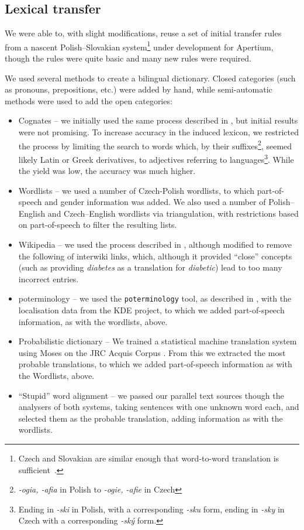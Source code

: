 \documentclass[11pt]{article}
\begin{document}
\subsection{Lexical transfer}

We were able to, with slight modifications, reuse a set of initial
transfer rules from a nascent Polish--Slovakian system\footnote{Czech 
and Slovakian are similar enough that word-to-word translation is sufficient~\citep{}.} under
development for Apertium, though the rules were quite basic
and many new rules were required.

We used several methods to create a bilingual dictionary. Closed 
categories (such as pronouns, prepositions, etc.) were added by
hand, while semi-automatic methods were used to add the open 
categories:

\begin{itemize}
\item Cognates -- we initially used the same process described in \cite{tyers2009rfr}, 
but initial results were not promising. To increase accuracy in the induced lexicon,
we restricted the process by limiting the search to words which, by their 
suffixes\footnote{\emph{-ogia, -afia} in Polish to \emph{-ogie, -afie} in Czech}, 
seemed likely Latin or Greek derivatives, to adjectives referring to 
languages\footnote{Ending in \emph{-ski} in Polish, with a corresponding \emph{-sku} form,
ending in \emph{-sky} in Czech with a corresponding \emph{-ský} form.}. While the
yield was low, the accuracy was much higher.

\item Wordlists -- we used a number of Czech-Polish wordlists, to which part-of-speech 
and gender information was added. We also used a number of Polish--English and Czech--English
wordlists via triangulation, with restrictions based on part-of-speech to filter the
resulting lists.

\item Wikipedia -- we used the process described in \cite{tyers2008}, although modified to
remove the following of interwiki links, which, although it provided ``close'' concepts
(such as providing \emph{diabetes} as a translation for \emph{diabetic}) lead to too
many incorrect entries.

\item poterminology -- we used the {\tt\small poterminology} tool, as described in
\cite{unhammer2009rfr}, with the localisation data from the KDE project, to which
we added part-of-speech information, as with the wordlists, above.

\item Probabilistic dictionary -- We trained a statistical machine translation system
using Moses \citep{Koehn2007} on the JRC Acquis Corpus \citep{Steinberger2006}. From this
we extracted the most probable translations, to which we added part-of-speech information
as with the Wordlists, above.

\item ``Stupid'' word alignment -- we passed our parallel text sources though the
analysers of both systems, taking sentences with one unknown word each, and selected
them as the probable translation, adding information as with the wordlists.
\end{itemize}
\end{document}
